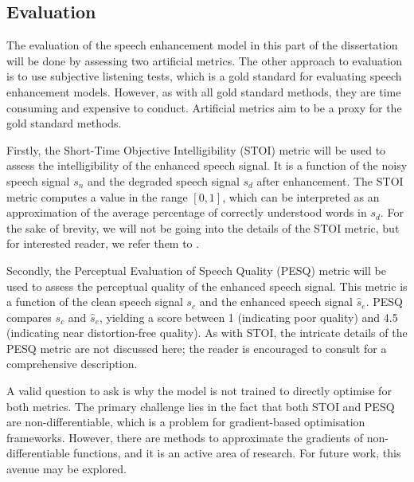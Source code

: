 \documentclass[logo,bsc,singlespacing,parskip,online]{infthesis}
\begin{document}
\subsection{Evaluation}
The evaluation of the speech enhancement model in this part of the dissertation will be 
done by assessing two artificial metrics. The other approach to evaluation is 
to use subjective listening tests, which is a gold standard for evaluating speech enhancement models.
However, as with all gold standard methods, they are time consuming and expensive to conduct. 
Artificial metrics aim to be a proxy for the gold standard methods. 

Firstly, the Short-Time Objective Intelligibility (STOI) \citep{taal_algorithm_2011} metric will be used to assess the intelligibility of the enhanced speech signal.
It is a function of the noisy speech signal $s_n$ and the degraded speech signal $s_d$ after enhancement.
The STOI metric computes a value in the range \([0, 1]\), which can be interpreted as an approximation of the average percentage of correctly understood words in $s_d$. 
For the sake of brevity, we will not be going into the details of the STOI metric, but for interested reader, we refer them to \citet{taal_algorithm_2011}.

Secondly, the Perceptual Evaluation of Speech Quality (PESQ) \citep{rix_perceptual_2001} metric will be 
used to assess the perceptual quality of the enhanced speech signal. 
This metric is a function of the clean speech signal $s_c$ and the enhanced speech signal $\hat{s}_e$.
PESQ compares $s_c$ and $\hat{s}_e$, yielding a score between 1 (indicating poor quality) and 4.5 (indicating near distortion-free quality). 
As with STOI, the intricate details of the PESQ metric are not discussed here; the reader is encouraged to consult \citet{rix_perceptual_2001} for a comprehensive description.

A valid question to ask is why the model is not trained to directly optimise for both metrics. The primary challenge lies in the fact that both STOI and PESQ are non-differentiable,
which is a problem for gradient-based optimisation frameworks. However, there are methods to approximate the gradients of non-differentiable functions, and it is an active area of research.
For future work, this avenue may be explored. 
\end{document}
